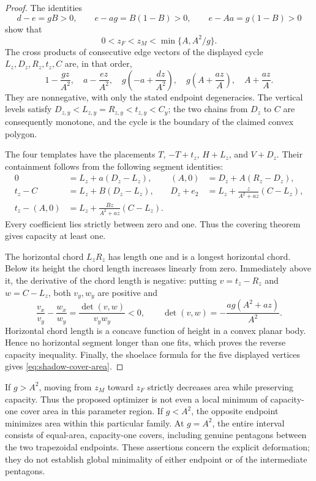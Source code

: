 \begin{proof}
The identities
\[
 d-e=gB>0,\qquad e-ag=B(1-B)>0,\qquad e-Aa=g(1-B)>0
\]
show that
\[
 0<z_F<z_M<\min\{A,A^2/g\}.
\]
The cross products of consecutive edge vectors of the displayed cycle
$L_z,D_z,R_z,t_z,C$ are, in that order,
\[
 1-\frac{gz}{A^2},\quad
 a-\frac{ez}{A^2},\quad
 g\left(-a+\frac{dz}{A^2}\right),\quad
 g\left(A+\frac{az}{A}\right),\quad
 A+\frac{az}{A}.
\]
They are nonnegative, with only the stated endpoint degeneracies. The
vertical levels satisfy
$D_{z,y}<L_{z,y}=R_{z,y}<t_{z,y}<C_y$; the two chains from $D_z$ to
$C$ are consequently monotone, and the cycle is the boundary of the
claimed convex polygon.

The four templates have the placements $T$, $-T+t_z$, $H+L_z$, and
$V+D_z$. Their containment follows from the following segment identities:
\begin{align*}
 0&=L_z+a(D_z-L_z),&
 (A,0)&=D_z+A(R_z-D_z),\\
 t_z-C&=L_z+B(D_z-L_z),&
 D_z+e_2&=L_z+\frac{z}{A^2+az}(C-L_z),\\
 t_z-(A,0)&=L_z+\frac{Bz}{A^2+az}(C-L_z).
\end{align*}
Every coefficient lies strictly between zero and one. Thus the covering
theorem gives capacity at least one.

The horizontal chord $L_zR_z$ has length one and is a longest horizontal
chord. Below its height the chord length increases linearly from zero.
Immediately above it, the derivative of the chord length is negative:
putting $v=t_z-R_z$ and $w=C-L_z$, both $v_y,w_y$ are positive and
\[
 \frac{v_x}{v_y}-\frac{w_x}{w_y}
 =\frac{\det(v,w)}{v_yw_y}<0,
 \qquad
 \det(v,w)=-\frac{ag(A^2+az)}{A^2}.
\]
Horizontal chord length is a concave function of height in a convex
planar body. Hence no horizontal segment longer than one fits, which
proves the reverse capacity inequality. Finally, the shoelace formula
for the five displayed vertices gives \eqref{eq:shadow-cover-area}.
\end{proof}

If $g>A^2$, moving from $z_M$ toward $z_F$ strictly decreases area while
preserving capacity. Thus the proposed optimizer is not even a local
minimum of capacity-one cover area in this parameter region. If
$g<A^2$, the opposite endpoint minimizes area within this particular
family. At $g=A^2$, the entire interval consists of equal-area,
capacity-one covers, including genuine pentagons between the two
trapezoidal endpoints. These assertions concern the explicit deformation;
they do not establish global minimality of either endpoint or of the
intermediate pentagons.

